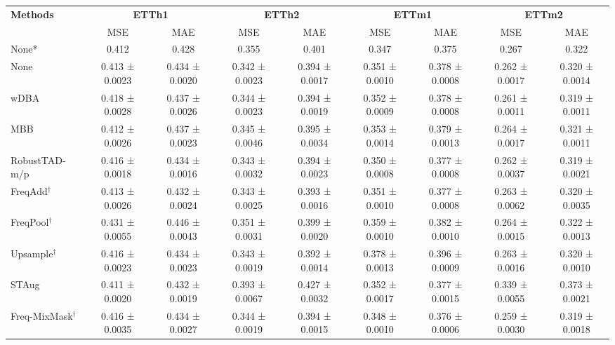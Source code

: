 \begin{table}[h!]
\centering
\vspace{0.2cm}
\renewcommand{\arraystretch}{1.3}
\begin{adjustbox}{max width=\textwidth}
\begin{tabular}{l|cc|cc|cc|cc}
    \toprule
    \textbf{Methods} & \multicolumn{2}{c|}{\textbf{ETTh1}} & \multicolumn{2}{c|}{\textbf{ETTh2}} & \multicolumn{2}{c|}{\textbf{ETTm1}} & \multicolumn{2}{c}{\textbf{ETTm2}} \\
    & MSE & MAE & MSE & MAE & MSE & MAE & MSE & MAE \\
    \midrule
    None* & 0.412 & 0.428 & 0.355 & 0.401 & 0.347 & 0.375 & 0.267 & 0.322 \\
    None & 0.413 ± 0.0023 & 0.434 ± 0.0020 & 0.342 ± 0.0023 & 0.394 ± 0.0017 & 0.351 ± 0.0010 & 0.378 ± 0.0008 & 0.262 ± 0.0017 & 0.320 ± 0.0014 \\
    wDBA & 0.418 ± 0.0028 & 0.437 ± 0.0026 & 0.344 ± 0.0023 & 0.394 ± 0.0019 & 0.352 ± 0.0009 & 0.378 ± 0.0008 & 0.261 ± 0.0011 & 0.319 ± 0.0011 \\
    MBB & 0.412 ± 0.0026 & 0.437 ± 0.0023 & 0.345 ± 0.0046 & 0.395 ± 0.0034 & 0.353 ± 0.0014 & 0.379 ± 0.0013 & 0.264 ± 0.0017 & 0.321 ± 0.0011 \\
    RobustTAD-m/p & 0.416 ± 0.0018 & 0.434 ± 0.0016 & 0.343 ± 0.0032 & 0.394 ± 0.0023 & 0.350 ± 0.0008 & 0.377 ± 0.0008 & 0.262 ± 0.0037 & 0.319 ± 0.0021  \\
    FreqAdd$^{\dagger}$ & 0.413 ± 0.0026 & 0.432 ± 0.0024 & 0.343 ± 0.0025 & 0.393 ± 0.0016 & 0.351 ± 0.0010 & 0.377 ± 0.0008 & 0.263 ± 0.0062 & 0.320 ± 0.0035  \\
    FreqPool$^{\dagger}$ & 0.431 ± 0.0055 & 0.446 ± 0.0043 & 0.351 ± 0.0031 & 0.399 ± 0.0020 & 0.359 ± 0.0010 & 0.382 ± 0.0010 & 0.264 ± 0.0015 & 0.322 ± 0.0013 \\
    Upsample$^{\dagger}$ & 0.416 ± 0.0023 & 0.434 ± 0.0023 & 0.343 ± 0.0019 & \cellcolor{secondcolor}0.392 ± 0.0014 & 0.378 ± 0.0013 & 0.396 ± 0.0009 & 0.263 ± 0.0016 & 0.320 ± 0.0010  \\
    STAug & 0.411 ± 0.0020 & 0.432 ± 0.0019 & 0.393 ± 0.0067 & 0.427 ± 0.0032 & 0.352 ± 0.0017 & 0.377 ± 0.0015 & 0.339 ± 0.0055 & 0.373 ± 0.0021  \\
    Freq-MixMask$^{\dagger}$ & 0.416 ± 0.0035 & 0.434 ± 0.0027 & 0.344 ± 0.0019 & 0.394 ± 0.0015 & \cellcolor{secondcolor}0.348 ± 0.0010 & \cellcolor{secondcolor}0.376 ± 0.0006 & \cellcolor{secondcolor}0.259 ± 0.0030 & \cellcolor{secondcolor}0.319 ± 0.0018  \\

\end{tabular}
\end{adjustbox}
\end{table}
